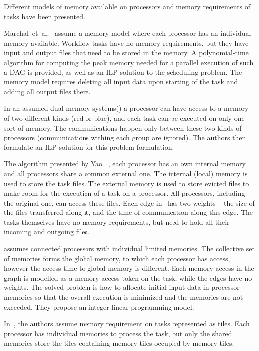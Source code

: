 \documentclass[conference]{IEEEtran}
\begin{document}
    Different models of memory available on processors and memory requirements of tasks have been presented.

    Marchal~et~al.~\cite{marchal2018parallel} assume a memory model where each processor has an individual memory available.
    Workflow tasks have no memory requirements, but they have input and output files that need to be stored in the memory.
    A polynomial-time algorithm for computing the peak memory needed for a parallel execution of such a DAG is provided,
    as well as an ILP solution to the scheduling problem.
    The memory model requires deleting all input data upon starting of the task and adding all output files there.

    In an assumed dual-memory systems(\cite{herrmann2014memory}) a processor can have access to a memory of two different
    kinds (red or blue), and each task can be executed on only one sort of memory.
    The communications happen only between these two kinds of processors (communications withing each group are ignored).
    The authors then formulate an ILP solution for this problem formulation.

    The algorithm presented by Yao \etal~\cite{yao2022memory}, each processor has an own internal memory and all
    processors share a common external one. The internal (local) memory is used to store the task files.
    The external memory is used to store evicted files to make room for the execution of a task on a processor.
    All processors, including the original one, can access these files.
    Each edge in~\cite{yao2022memory} has two weights -- the size of the files transferred along it,
    and the time of communication along this edge.
    The tasks themselves have no memory requirements, but need to hold all their incoming and outgoing files.

    \cite{ding2024ils} assumes connected processors with individual limited memories.
    The collective set of memories forms the global memory, to which each processor has access, however the access time
    to global memory is different.
    Each memory access in the graph is modelled as a memory access token on the task, while the edges have no weights.
    The solved problem is how to allocate initial input data in processor memories so that the overall
    execution is minimized and the memories are not exceeded.
    They propose an integer linear programming model.

    In~\cite{rodriguez2019exploration}, the authors assume memory requirement on tasks represented as tiles.
    Each processor has individual memories to process the task, but only the shared memories store the tiles containing
    memory tiles occupied by memory tiles.
\end{document}
